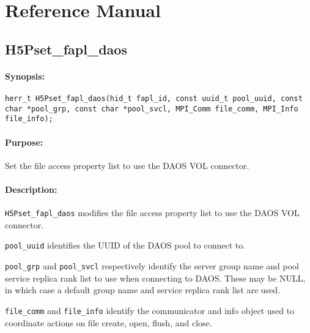 \documentclass[../users_guide.tex]{subfiles}
\begin{document}
\section{Reference Manual}
\label{apdx:ref_manual}

\subsection{H5Pset\_fapl\_daos}
\label{ref:h5pset_fapl_daos}

\paragraph{Synopsis:}
\begin{flushleft}%
\begin{verbatim}
herr_t H5Pset_fapl_daos(hid_t fapl_id, const uuid_t pool_uuid, const char *pool_grp, const char *pool_svcl, MPI_Comm file_comm, MPI_Info file_info);
\end{verbatim}
\end{flushleft}%

\paragraph{Purpose:}
\begin{flushleft}%
Set the file access property list to use the DAOS VOL connector.
\end{flushleft}%

\paragraph{Description:}
\begin{flushleft}%
\texttt{H5Pset\_fapl\_daos} modifies the file access property list to use the
DAOS VOL connector.

\texttt{pool\_uuid} identifies the UUID of the DAOS pool to connect to.

\texttt{pool\_grp} and \texttt{pool\_svcl} respectively identify the server
group name and pool service replica rank list to use when connecting to DAOS.
These may be NULL, in which case a default group name and service replica rank
list are used.

\texttt{file\_comm} and \texttt{file\_info} identify the communicator and info
object used to coordinate actions on file create, open, flush, and close.
\end{flushleft}%
\end{document}
